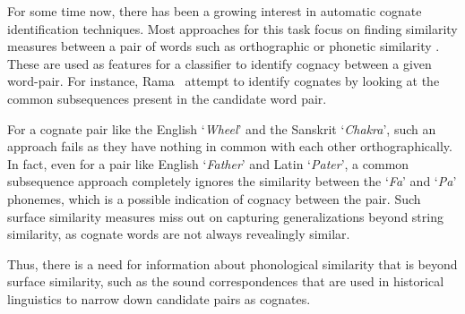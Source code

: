 \documentclass[11pt,letterpaper]{article}
\begin{document}
For some time now, there has been a growing interest in automatic cognate identification techniques. Most approaches for this task focus on finding similarity measures between a pair of words such as orthographic or phonetic similarity \cite{hauer2011clustering,inkpen2005similarity,List2016g}. These are used as features for a classifier to identify cognacy between a given word-pair.  
For instance, Rama~ attempt to identify cognates by looking at the common subsequences present in the candidate word pair.

For a cognate pair like the English `\textit{Wheel}' and the Sanskrit `\textit{Chakra}', such an approach fails as they have nothing in common with each other orthographically. In fact, even for a pair like English `\textit{Father}' and Latin `\textit{Pater}', a common subsequence approach completely ignores the similarity between the `\textit{Fa}' and `\textit{Pa}' phonemes, which is a possible indication of cognacy between the pair. Such surface similarity measures miss out on capturing generalizations beyond string similarity, as cognate words are not always revealingly similar. 

Thus, there is a need for information about phonological similarity that is beyond surface similarity, such as the sound correspondences that are used in historical linguistics to narrow down candidate pairs as cognates.
\end{document}
